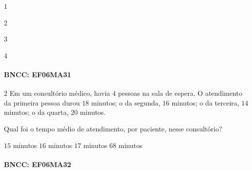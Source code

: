 {\begin{escolha}
\item $1$
\item $2$
\item $3$
\item $4$
\end{escolha}

\paragraph{BNCC: EF06MA31 }


\num{2}  Em um consultório médico, havia $4$ pessoas na sala de espera. O
atendimento da primeira pessoa durou $18$ minutos; o da segunda, $16$
minutos; o da terceira, $14$ minutos; o da quarta, $20$ minutos.

Qual foi o tempo médio de atendimento, por paciente, nesse consultório?

\begin{boxlist}
\boxitem[] $15$ minutos
\boxitem[] $16$ minutos
\boxitem[] $17$ minutos
\boxitem[] $68$ minutos
\end{boxlist}

\paragraph{BNCC: EF06MA32 }

}
